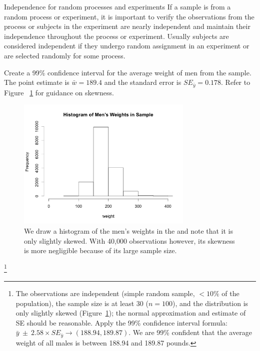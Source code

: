 \begin{caution}
{Independence for random processes and experiments}
{If a sample is from a random process or experiment, it is important to verify the observations from the process or subjects in the experiment are nearly independent and maintain their independence throughout the process or experiment. Usually subjects are considered independent if they undergo random assignment in an experiment or are selected randomly for some process.}
\end{caution}

\begin{exercise} \label{find99CIForBRFSSWeightExercise}
Create a 99\% confidence interval for the average weight of men from the  sample. The point estimate is $\bar{w} = 189.4$ and the standard error is $SE_{\bar{y}} = 0.178$. Refer to Figure ~\ref{brfssSampHist} for guidance on skewness.
\begin{figure}
\centering
\includegraphics[width=0.75\textwidth]{ch_inference_foundations_oi_biostat/figures/choosingZForCI/brfssSampHist.png}
\caption{We draw a histogram of the men's weights in the  and note that it is only slightly skewed. With 40,000 observations however, its skewness is more negligible because of its large sample size.}
\label{brfssSampHist}
\end{figure}
\footnote{The observations are independent (simple random sample, $<10\%$ of the population), the sample size is at least 30 ($n=100$), and the distribution is only slightly skewed (Figure~\ref{brfssSampHist}); the normal approximation and estimate of SE should be reasonable.  Apply the 99\% confidence interval formula: $\bar{y}\ \pm\ 2.58 \times  SE_{\bar{y}} \rightarrow (188.94, 189.87)$. We are 99\% confident that the average weight of all males is between 188.94 and 189.87 pounds.}
\end{exercise}

